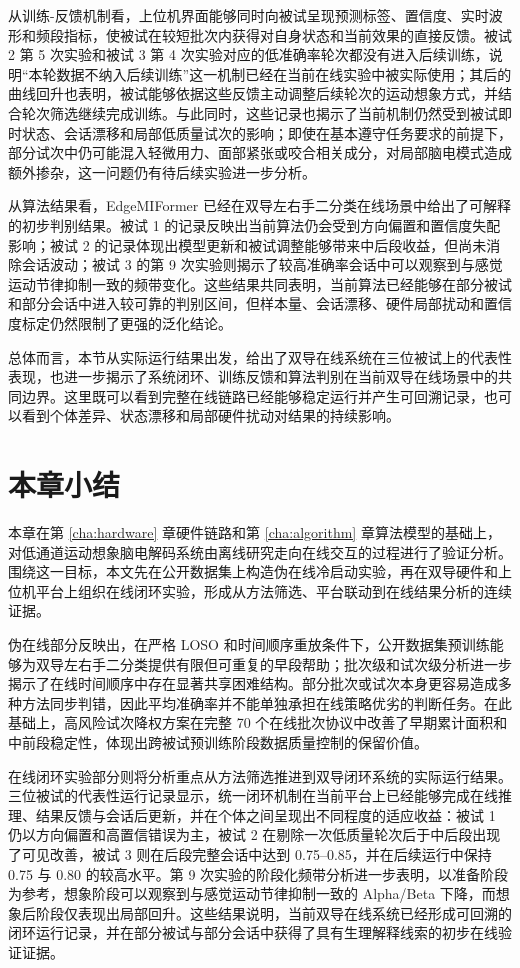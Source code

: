 从训练-反馈机制看，上位机界面能够同时向被试呈现预测标签、置信度、实时波形和频段指标，使被试在较短批次内获得对自身状态和当前效果的直接反馈。被试 2 第 5 次实验和被试 3 第 4 次实验对应的低准确率轮次都没有进入后续训练，说明“本轮数据不纳入后续训练”这一机制已经在当前在线实验中被实际使用；其后的曲线回升也表明，被试能够依据这些反馈主动调整后续轮次的运动想象方式，并结合轮次筛选继续完成训练。与此同时，这些记录也揭示了当前机制仍然受到被试即时状态、会话漂移和局部低质量试次的影响；即使在基本遵守任务要求的前提下，部分试次中仍可能混入轻微用力、面部紧张或咬合相关成分，对局部脑电模式造成额外掺杂，这一问题仍有待后续实验进一步分析。

从算法结果看，EdgeMIFormer 已经在双导左右手二分类在线场景中给出了可解释的初步判别结果。被试 1 的记录反映出当前算法仍会受到方向偏置和置信度失配影响；被试 2 的记录体现出模型更新和被试调整能够带来中后段收益，但尚未消除会话波动；被试 3 的第 9 次实验则揭示了较高准确率会话中可以观察到与感觉运动节律抑制一致的频带变化。这些结果共同表明，当前算法已经能够在部分被试和部分会话中进入较可靠的判别区间，但样本量、会话漂移、硬件局部扰动和置信度标定仍然限制了更强的泛化结论。

总体而言，本节从实际运行结果出发，给出了双导在线系统在三位被试上的代表性表现，也进一步揭示了系统闭环、训练反馈和算法判别在当前双导在线场景中的共同边界。这里既可以看到完整在线链路已经能够稳定运行并产生可回溯记录，也可以看到个体差异、状态漂移和局部硬件扰动对结果的持续影响。

\section{本章小结}

本章在第 \ref{cha:hardware} 章硬件链路和第 \ref{cha:algorithm} 章算法模型的基础上，对低通道运动想象脑电解码系统由离线研究走向在线交互的过程进行了验证分析。围绕这一目标，本文先在公开数据集上构造伪在线冷启动实验，再在双导硬件和上位机平台上组织在线闭环实验，形成从方法筛选、平台联动到在线结果分析的连续证据。

伪在线部分反映出，在严格 LOSO 和时间顺序重放条件下，公开数据集预训练能够为双导左右手二分类提供有限但可重复的早段帮助；批次级和试次级分析进一步揭示了在线时间顺序中存在显著共享困难结构。部分批次或试次本身更容易造成多种方法同步判错，因此平均准确率并不能单独承担在线策略优劣的判断任务。在此基础上，高风险试次降权方案在完整 70 个在线批次协议中改善了早期累计面积和中前段稳定性，体现出跨被试预训练阶段数据质量控制的保留价值。

在线闭环实验部分则将分析重点从方法筛选推进到双导闭环系统的实际运行结果。三位被试的代表性运行记录显示，统一闭环机制在当前平台上已经能够完成在线推理、结果反馈与会话后更新，并在个体之间呈现出不同程度的适应收益：被试 1 仍以方向偏置和高置信错误为主，被试 2 在剔除一次低质量轮次后于中后段出现了可见改善，被试 3 则在后段完整会话中达到 0.75--0.85，并在后续运行中保持 0.75 与 0.80 的较高水平。第 9 次实验的阶段化频带分析进一步表明，以准备阶段为参考，想象阶段可以观察到与感觉运动节律抑制一致的 Alpha/Beta 下降，而想象后阶段仅表现出局部回升。这些结果说明，当前双导在线系统已经形成可回溯的闭环运行记录，并在部分被试与部分会话中获得了具有生理解释线索的初步在线验证证据。

